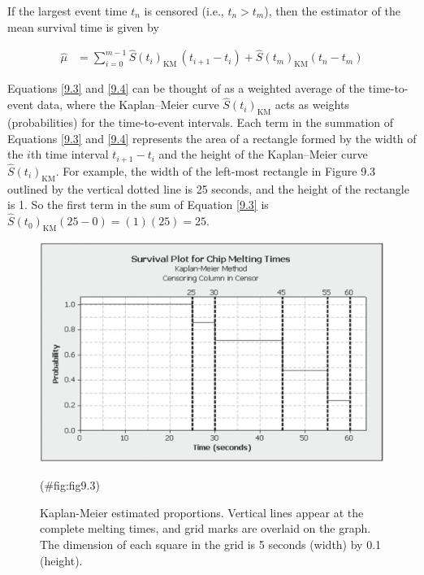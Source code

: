 \documentclass[
]{report}
\begin{document}
If the largest event time \(t_n\) is censored (i.e., \(t_n > t_m\)), then the estimator of the mean survival time is given by

\begin{align}\label{9.4}
\hat \mu 
&= \sum_{i=0}^{m-1} \hat S(t_i)_{\mathrm{KM}} \,(t_{i+1} - t_i) + \hat S(t_m)_{\mathrm{KM}}(t_n - t_m)
\tag{9.4}
\end{align}

Equations \ref{9.3} and \ref{9.4} can be thought of as a weighted average of the time-to-event data, where the Kaplan--Meier curve \(\hat S(t_i)_{\mathrm{KM}}\) acts as weights (probabilities) for the time-to-event intervals. Each term in the summation of Equations \ref{9.3} and \ref{9.4} represents the area of a rectangle formed by the width of the \(i\)th time interval \(t_{i+1} - t_i\) and the height of the Kaplan--Meier curve \(\hat S(t_i)_{\mathrm{KM}}\). For example, the width of the left-most rectangle in Figure 9.3 outlined by the vertical dotted line is 25 seconds, and the height of the rectangle is 1. So the first term in the sum of Equation \ref{9.3} is \(\hat S(t_0)_{\mathrm{KM}}(25 - 0) = (1)(25) = 25\).

\begin{figure}

{\centering \includegraphics[width=1\linewidth]{docs/Fig9_3} 

}

\caption{Kaplan-Meier estimated proportions. Vertical lines appear at the complete melting times, and grid marks are overlaid on the graph. The dimension of each square in the grid is 5 seconds (width) by 0.1 (height).}(\#fig:fig9.3)
\end{figure}

\large
\end{document}
